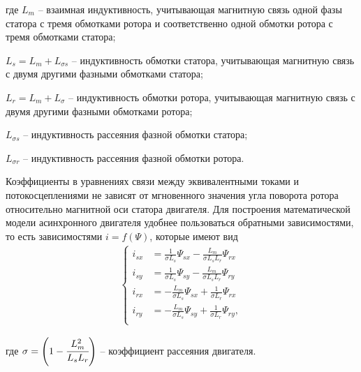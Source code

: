         где $L_m$ -- взаимная индуктивность, учитывающая магнитную связь одной
        фазы статора с тремя обмотками  ротора  и  соответственно  одной
        обмотки  ротора с тремя обмотками статора;

        $L_s=L_m+L_{\sigma s}$ -- индуктивность обмотки статора,
        учитывающая магнитную связь с двумя другими фазными обмотками
        статора;
        
        $L_r=L_m+L_{\sigma}$ -- индуктивность обмотки ротора, учитывающая
        магнитную связь с двумя другими фазными обмотками ротора;

        $L_{\sigma s}$ -- индуктивность рассеяния фазной обмотки статора;

        $L_{\sigma r}$ -- индуктивность рассеяния фазной обмотки ротора.

        Коэффициенты в уравнениях связи между эквивалентными токами и
        потокосцеплениями не зависят от мгновенного значения угла поворота
        ротора относительно магнитной оси статора двигателя. Для построения
        математической модели асинхронного двигателя удобнее пользоваться
        обратными зависимостями, то есть зависимостями $i=f(\Psi)$, которые
        имеют вид
        \begin{gather*}
            \left\{
            \begin{aligned}
                i_{sx} & =\frac{1}{\sigma L_s}\Psi_{sx}-
                    \frac{L_m}{\sigma L_s L_r}\Psi_{rx}\\
                i_{sy} & =\frac{1}{\sigma L_s}\Psi_{sy}-
                    \frac{L_m}{\sigma L_s L_r}\Psi_{ry}\\
                i_{rx} & =-\frac{L_m}{\sigma L_s}\Psi_{sx}+
                    \frac{1}{\sigma L_r}\Psi_{rx}\\
                i_{ry} & =-\frac{L_m}{\sigma L_s}\Psi_{sy}+
                    \frac{1}{\sigma L_r}\Psi_{ry},\\
            \end{aligned}
            \right.
        \end{gather*}

        где $\sigma=\left(1-\cfrac{L_m^2}{L_s L_r}\right)$ -- коэффициент
        рассеяния двигателя.

